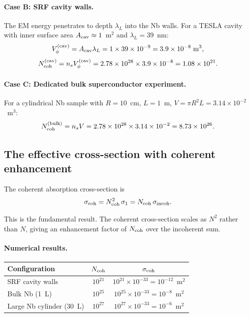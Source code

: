 \documentclass[12pt,aps,prd,twocolumn,superscriptaddress,nofootinbib]{revtex4-2}
\newcommand{\ee}[1]{\times 10^{#1}}
\begin{document}
\paragraph{Case B: SRF cavity walls.}
The EM energy penetrates to depth $\lambda_L$ into the Nb walls.
For a TESLA cavity with inner surface area $A_{\rm cav} \approx 1$~m$^2$
and $\lambda_L = 39$~nm:
\begin{equation}\label{eq:Vcoh-cavity}
V_\phi^{(\rm cav)} = A_{\rm cav}\lambda_L
= 1 \times 39\ee{-9} = 3.9\ee{-8}\;\si{m^3},
\end{equation}
\begin{equation}\label{eq:Ncoh-cavity}
N_{\rm coh}^{(\rm cav)} = n_s V_\phi^{(\rm cav)}
= 2.78\ee{28} \times 3.9\ee{-8} = 1.08\ee{21}.
\end{equation}

\paragraph{Case C: Dedicated bulk superconductor experiment.}
For a cylindrical Nb sample with $R = 10$~cm, $L = 1$~m,
$V = \pi R^2 L = 3.14\ee{-2}$~m$^3$:
\begin{equation}\label{eq:Ncoh-bulk-num}
N_{\rm coh}^{(\rm bulk)} = n_s V = 2.78\ee{28} \times 3.14\ee{-2}
= 8.73\ee{26}.
\end{equation}

\subsection{The effective cross-section with coherent enhancement}

The coherent absorption cross-section is
\begin{equation}\label{eq:sigma-coh}
\sigma_{\rm coh} = N_{\rm coh}^2\,\sigma_1
= N_{\rm coh}\,\sigma_{\rm incoh}.
\end{equation}

This is the fundamental result. The coherent cross-section scales as
$N^2$ rather than $N$, giving an enhancement factor of $N_{\rm coh}$
over the incoherent sum.

\paragraph{Numerical results.}

\begin{center}
\begin{tabular}{lcc}
\toprule
Configuration & $N_{\rm coh}$ & $\sigma_{\rm coh}$ \\
\midrule
SRF cavity walls & $10^{21}$ & $10^{21}\ee{-33} = 10^{-12}$~m$^2$ \\
Bulk Nb (1~L) & $10^{25}$ & $10^{25}\ee{-33} = 10^{-8}$~m$^2$ \\
Large Nb cylinder (30~L) & $10^{27}$ & $10^{27}\ee{-33} = 10^{-6}$~m$^2$ \\
\bottomrule
\end{tabular}
\end{center}
\end{document}
